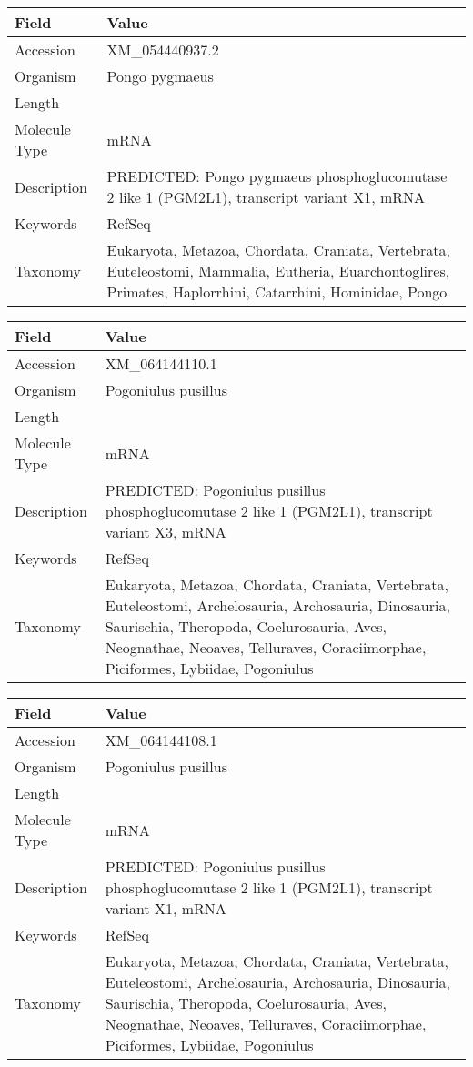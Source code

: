 \documentclass[10pt]{article}
\begin{document}
\vspace{1em}
{\footnotesize
\begin{longtable}{>{\raggedright\arraybackslash}p{4.5cm} >{\raggedright\arraybackslash}p{11.5cm}}
\textbf{Field} & \textbf{Value} \\
\hline
Accession & XM\_054440937.2 \\
Organism & Pongo pygmaeus \\
Length & 8549 \\
Molecule Type & mRNA \\
Description & PREDICTED: Pongo pygmaeus phosphoglucomutase 2 like 1 (PGM2L1), transcript variant X1, mRNA \\
Keywords & RefSeq \\
Taxonomy & Eukaryota, Metazoa, Chordata, Craniata, Vertebrata, Euteleostomi, Mammalia, Eutheria, Euarchontoglires, Primates, Haplorrhini, Catarrhini, Hominidae, Pongo \\
\end{longtable}
}

\vspace{1em}
{\footnotesize
\begin{longtable}{>{\raggedright\arraybackslash}p{4.5cm} >{\raggedright\arraybackslash}p{11.5cm}}
\textbf{Field} & \textbf{Value} \\
\hline
Accession & XM\_064144110.1 \\
Organism & Pogoniulus pusillus \\
Length & 2720 \\
Molecule Type & mRNA \\
Description & PREDICTED: Pogoniulus pusillus phosphoglucomutase 2 like 1 (PGM2L1), transcript variant X3, mRNA \\
Keywords & RefSeq \\
Taxonomy & Eukaryota, Metazoa, Chordata, Craniata, Vertebrata, Euteleostomi, Archelosauria, Archosauria, Dinosauria, Saurischia, Theropoda, Coelurosauria, Aves, Neognathae, Neoaves, Telluraves, Coraciimorphae, Piciformes, Lybiidae, Pogoniulus \\
\end{longtable}
}

\vspace{1em}
{\footnotesize
\begin{longtable}{>{\raggedright\arraybackslash}p{4.5cm} >{\raggedright\arraybackslash}p{11.5cm}}
\textbf{Field} & \textbf{Value} \\
\hline
Accession & XM\_064144108.1 \\
Organism & Pogoniulus pusillus \\
Length & 2904 \\
Molecule Type & mRNA \\
Description & PREDICTED: Pogoniulus pusillus phosphoglucomutase 2 like 1 (PGM2L1), transcript variant X1, mRNA \\
Keywords & RefSeq \\
Taxonomy & Eukaryota, Metazoa, Chordata, Craniata, Vertebrata, Euteleostomi, Archelosauria, Archosauria, Dinosauria, Saurischia, Theropoda, Coelurosauria, Aves, Neognathae, Neoaves, Telluraves, Coraciimorphae, Piciformes, Lybiidae, Pogoniulus \\
\end{longtable}
}
\end{document}
